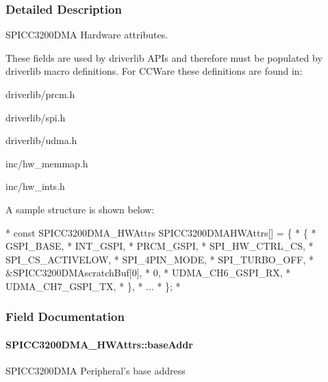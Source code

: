 \subsubsection{Detailed Description}
S\-P\-I\-C\-C3200\-D\-M\-A Hardware attributes. 

These fields are used by driverlib A\-P\-Is and therefore must be populated by driverlib macro definitions. For C\-C\-Ware these definitions are found in\-:
\begin{DoxyItemize}
\item driverlib/prcm.\-h
\item driverlib/spi.\-h
\item driverlib/udma.\-h
\item inc/hw\-\_\-memmap.\-h
\item inc/hw\-\_\-ints.\-h
\end{DoxyItemize}

A sample structure is shown below\-: 
\begin{DoxyCode}
*  \textcolor{keyword}{const} SPICC3200DMA_HWAttrs SPICC3200DMAHWAttrs[] = \{
*      \{
*          GSPI\_BASE,
*          INT\_GSPI,
*          PRCM\_GSPI,
*          SPI\_HW\_CTRL\_CS,
*          SPI\_CS\_ACTIVELOW,
*          SPI\_4PIN\_MODE,
*          SPI\_TURBO\_OFF,
*          &SPICC3200DMAscratchBuf[0],
*          0,
*          UDMA\_CH6\_GSPI\_RX,
*          UDMA\_CH7\_GSPI\_TX,
*      \},
*      ...
*  \};
*  
\end{DoxyCode}
 

\subsubsection{Field Documentation}
\paragraph[{base\-Addr}]{ S\-P\-I\-C\-C3200\-D\-M\-A\-\_\-\-H\-W\-Attrs\-::base\-Addr}\label{struct_s_p_i_c_c3200_d_m_a___h_w_attrs_a9c8d969d44a09aad6ed1682708147793}
S\-P\-I\-C\-C3200\-D\-M\-A Peripheral's base address 
